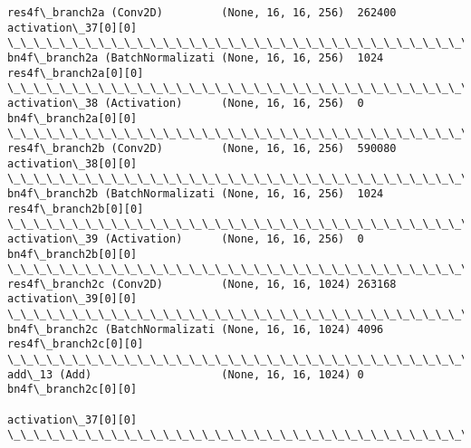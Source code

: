 \documentclass[11pt]{article}
\begin{document}
\begin{Verbatim}[commandchars=\\\{\}]
res4f\_branch2a (Conv2D)         (None, 16, 16, 256)  262400      activation\_37[0][0]              
\_\_\_\_\_\_\_\_\_\_\_\_\_\_\_\_\_\_\_\_\_\_\_\_\_\_\_\_\_\_\_\_\_\_\_\_\_\_\_\_\_\_\_\_\_\_\_\_\_\_\_\_\_\_\_\_\_\_\_\_\_\_\_\_\_\_\_\_\_\_\_\_\_\_\_\_\_\_\_\_\_\_\_\_\_\_\_\_\_\_\_\_\_\_\_\_\_\_
bn4f\_branch2a (BatchNormalizati (None, 16, 16, 256)  1024        res4f\_branch2a[0][0]             
\_\_\_\_\_\_\_\_\_\_\_\_\_\_\_\_\_\_\_\_\_\_\_\_\_\_\_\_\_\_\_\_\_\_\_\_\_\_\_\_\_\_\_\_\_\_\_\_\_\_\_\_\_\_\_\_\_\_\_\_\_\_\_\_\_\_\_\_\_\_\_\_\_\_\_\_\_\_\_\_\_\_\_\_\_\_\_\_\_\_\_\_\_\_\_\_\_\_
activation\_38 (Activation)      (None, 16, 16, 256)  0           bn4f\_branch2a[0][0]              
\_\_\_\_\_\_\_\_\_\_\_\_\_\_\_\_\_\_\_\_\_\_\_\_\_\_\_\_\_\_\_\_\_\_\_\_\_\_\_\_\_\_\_\_\_\_\_\_\_\_\_\_\_\_\_\_\_\_\_\_\_\_\_\_\_\_\_\_\_\_\_\_\_\_\_\_\_\_\_\_\_\_\_\_\_\_\_\_\_\_\_\_\_\_\_\_\_\_
res4f\_branch2b (Conv2D)         (None, 16, 16, 256)  590080      activation\_38[0][0]              
\_\_\_\_\_\_\_\_\_\_\_\_\_\_\_\_\_\_\_\_\_\_\_\_\_\_\_\_\_\_\_\_\_\_\_\_\_\_\_\_\_\_\_\_\_\_\_\_\_\_\_\_\_\_\_\_\_\_\_\_\_\_\_\_\_\_\_\_\_\_\_\_\_\_\_\_\_\_\_\_\_\_\_\_\_\_\_\_\_\_\_\_\_\_\_\_\_\_
bn4f\_branch2b (BatchNormalizati (None, 16, 16, 256)  1024        res4f\_branch2b[0][0]             
\_\_\_\_\_\_\_\_\_\_\_\_\_\_\_\_\_\_\_\_\_\_\_\_\_\_\_\_\_\_\_\_\_\_\_\_\_\_\_\_\_\_\_\_\_\_\_\_\_\_\_\_\_\_\_\_\_\_\_\_\_\_\_\_\_\_\_\_\_\_\_\_\_\_\_\_\_\_\_\_\_\_\_\_\_\_\_\_\_\_\_\_\_\_\_\_\_\_
activation\_39 (Activation)      (None, 16, 16, 256)  0           bn4f\_branch2b[0][0]              
\_\_\_\_\_\_\_\_\_\_\_\_\_\_\_\_\_\_\_\_\_\_\_\_\_\_\_\_\_\_\_\_\_\_\_\_\_\_\_\_\_\_\_\_\_\_\_\_\_\_\_\_\_\_\_\_\_\_\_\_\_\_\_\_\_\_\_\_\_\_\_\_\_\_\_\_\_\_\_\_\_\_\_\_\_\_\_\_\_\_\_\_\_\_\_\_\_\_
res4f\_branch2c (Conv2D)         (None, 16, 16, 1024) 263168      activation\_39[0][0]              
\_\_\_\_\_\_\_\_\_\_\_\_\_\_\_\_\_\_\_\_\_\_\_\_\_\_\_\_\_\_\_\_\_\_\_\_\_\_\_\_\_\_\_\_\_\_\_\_\_\_\_\_\_\_\_\_\_\_\_\_\_\_\_\_\_\_\_\_\_\_\_\_\_\_\_\_\_\_\_\_\_\_\_\_\_\_\_\_\_\_\_\_\_\_\_\_\_\_
bn4f\_branch2c (BatchNormalizati (None, 16, 16, 1024) 4096        res4f\_branch2c[0][0]             
\_\_\_\_\_\_\_\_\_\_\_\_\_\_\_\_\_\_\_\_\_\_\_\_\_\_\_\_\_\_\_\_\_\_\_\_\_\_\_\_\_\_\_\_\_\_\_\_\_\_\_\_\_\_\_\_\_\_\_\_\_\_\_\_\_\_\_\_\_\_\_\_\_\_\_\_\_\_\_\_\_\_\_\_\_\_\_\_\_\_\_\_\_\_\_\_\_\_
add\_13 (Add)                    (None, 16, 16, 1024) 0           bn4f\_branch2c[0][0]              
                                                                 activation\_37[0][0]              
\_\_\_\_\_\_\_\_\_\_\_\_\_\_\_\_\_\_\_\_\_\_\_\_\_\_\_\_\_\_\_\_\_\_\_\_\_\_\_\_\_\_\_\_\_\_\_\_\_\_\_\_\_\_\_\_\_\_\_\_\_\_\_\_\_\_\_\_\_\_\_\_\_\_\_\_\_\_\_\_\_\_\_\_\_\_\_\_\_\_\_\_\_\_\_\_\_\_

\end{Verbatim}
\end{document}
